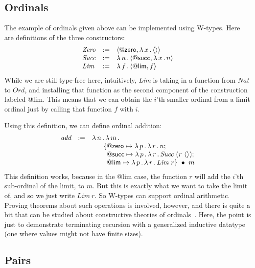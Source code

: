 \documentclass{article}
\begin{document}
\subsection{Ordinals}

The example of ordinals given above can be implemented using W-types.  Here are definitions of the three constructors:
\[
\begin{array}{lll}
  \textit{Zero} & := & \langle \mathsf{@zero} , \lambda\, x\, .\, \langle\rangle \rangle \\
  \textit{Succ} & := & \lambda\, n\, .\, \langle \mathsf{@succ} , \lambda\, x\, .\, n \rangle \\
  \textit{Lim} & := & \lambda\, f\, .\, \langle \mathsf{@lim} , f \rangle
\end{array}
\]
\noindent While we are still type-free here, intuitively, \textit{Lim} is taking in a function from $\textit{Nat}$ to $\textit{Ord}$, and
installing that function as the second component of the construction labeled \textsf{@lim}.  This means that we can obtain the $i$'th smaller
ordinal from a limit ordinal just by calling that function $f$ with $i$.

Using this definition, we can define ordinal addition:
\[
\begin{array}{lll}
  \textit{add} & := & \lambda\, n\, .\, \lambda\, m\, .\, \  \\
  \ & \ & \ \ \ \ \ \{\mathsf{@zero} \mapsto \lambda\, p\, .\, \lambda\, r\, .\, n ;  \\
  \ & \ & \ \ \ \ \ \ \, \mathsf{@succ} \mapsto \lambda\, p\, .\, \lambda\, r\, .\, \textit{Succ}\ (r\ \langle\rangle); \\
  \ & \ & \ \ \ \ \ \ \, \mathsf{@lim} \mapsto \lambda\, p\, .\, \lambda\, r\, .\, \textit{Lim}\ r \}\ \bullet\ m
\end{array}
\]
\noindent This definition works, because in the \textsf{@lim} case,
the function $r$ will add the $i$'th sub-ordinal of the limit, to $m$.
But this is exactly what we want to take the limit of, and so we just
write $\textit{Lim}\ r$.  So W-types can support ordinal arithmetic.
Proving theorems about such operations is involved, however, and there
is quite a bit that can be studied about constructive theories of
ordinals~\cite{kraus23}.  Here, the point is just to demonstrate
terminating recursion with a generalized inductive datatype (one
where values might not have finite sizes).

\subsection{Pairs}
\end{document}
